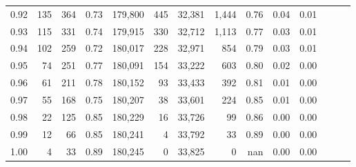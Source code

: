 \begin{tabular}{rrrrrrrrrrrrrr}
0.92 &    135 &  364 &  0.73 &  179,800 &      445 &  32,381 &   1,444 &  0.76 &  0.04 &      0.01 \\
0.93 &    115 &  331 &  0.74 &  179,915 &      330 &  32,712 &   1,113 &  0.77 &  0.03 &      0.01 \\
0.94 &    102 &  259 &  0.72 &  180,017 &      228 &  32,971 &     854 &  0.79 &  0.03 &      0.01 \\
0.95 &     74 &  251 &  0.77 &  180,091 &      154 &  33,222 &     603 &  0.80 &  0.02 &      0.00 \\
0.96 &     61 &  211 &  0.78 &  180,152 &       93 &  33,433 &     392 &  0.81 &  0.01 &      0.00 \\
0.97 &     55 &  168 &  0.75 &  180,207 &       38 &  33,601 &     224 &  0.85 &  0.01 &      0.00 \\
0.98 &     22 &  125 &  0.85 &  180,229 &       16 &  33,726 &      99 &  0.86 &  0.00 &      0.00 \\
0.99 &     12 &   66 &  0.85 &  180,241 &        4 &  33,792 &      33 &  0.89 &  0.00 &      0.00 \\
1.00 &      4 &   33 &  0.89 &  180,245 &        0 &  33,825 &       0 &   nan &  0.00 &      0.00 \\
\bottomrule
\end{tabular}
